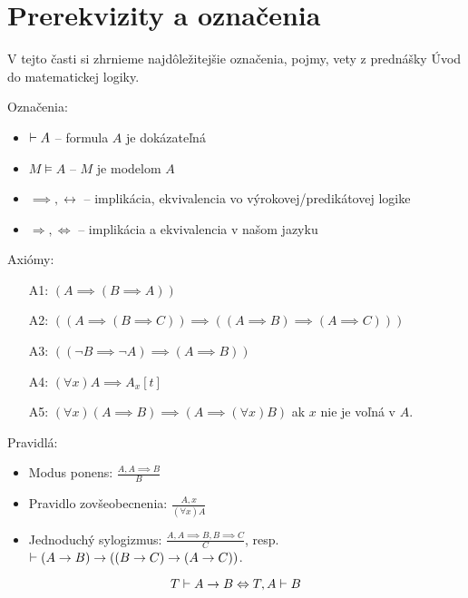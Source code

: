 \section{Prerekvizity a označenia}

V tejto časti si zhrnieme najdôležitejšie označenia, pojmy, vety z
prednášky Úvod do matematickej logiky.

\noindent Označenia:
\begin{itemize}
    \item $\vdash A$ -- formula $A$ je dokázateľná
    \item $M \models A$ -- $M$ je modelom $A$
    \item $\implies, \leftrightarrow$ -- implikácia, ekvivalencia vo
    výrokovej/predikátovej logike
    \item $\Rightarrow, \Leftrightarrow$ -- implikácia a ekvivalencia v
    našom jazyku
\end{itemize}

\noindent Axiómy:
\begin{itemize}
    \item[A1:] $(A \implies (B \implies A))$
    \item[A2:] $((A \implies (B \implies C)) \implies 
                ((A \implies B) \implies (A \implies C)))$
    \item[A3:] $((\neg B \implies \neg A) \implies (A \implies B))$
    \vskip 0.5cm
    \item[A4:] $(\forall x) A \implies A_x[t]$
    \item[A5:] $(\forall x) (A \implies B) \implies (A \implies
    (\forall x) B)$ ak $x$ nie je voľná v $A$.
\end{itemize}

\noindent Pravidlá:
\begin{itemize}
    \item Modus ponens: $\displaystyle \frac{A,A\implies B}{B}$
    \item Pravidlo zovšeobecnenia:
            $\displaystyle \frac{A,x}{(\forall x)A}$
    \item Jednoduchý sylogizmus:
            $\displaystyle \frac{A, A\implies B, B\implies C}{C}$, resp.
            $\vdash (A \rightarrow B) \rightarrow ((B \rightarrow C) 
                \rightarrow (A \rightarrow C))$.
\end{itemize}

\begin{veta}[O dedukcii]
    \begin{equation*}
        T \vdash A \rightarrow B \Leftrightarrow T,A \vdash B
    \end{equation*}
\end{veta}

